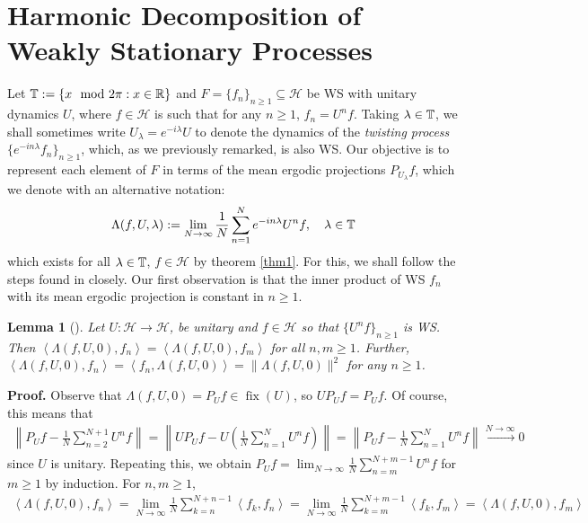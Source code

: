 \documentclass[11pt]{report}
\newcommand{\mc}[1]{\mathcal{#1}}
\newcommand{\ip}[2]{\left\langle#1,#2\right\rangle }
\newcommand{\1}[1]{\mathbbm{1}_{\{#1\}}}
\DeclareMathOperator{\fix}{fix}
\newtheorem{lemma}{Lemma}[section]
\theoremstyle{definition}
\begin{document}
    \section{Harmonic Decomposition of Weakly Stationary Processes}\label{sec4}
    Let $\mathbb{T}:=\{x\mod2\pi:x\in\mathbb{R}\}$ and $F=\{f_n\}_{n\geq
    1}\subseteq\mc{H}$ be WS with unitary dynamics $U$, where $f\in\mc{H}$ is
    such that for any $n\geq 1$, $f_n=U^nf$. Taking $\lambda\in\mathbb{T}$, we
    shall sometimes write $U_\lambda=e^{-i\lambda}U$ to denote the dynamics of
    the \textit{twisting process} $\{e^{-in\lambda}f_n\}_{n\geq 1}$, which, as
    we previously remarked, is also WS. Our objective is to represent each
    element of $F$ in terms of the mean ergodic projections $P_{U_\lambda}f$,
    which we denote with an alternative notation:
    \begin{align}
        \Lambda(f,U,\lambda):=\lim_{N\rightarrow\infty}\frac{1}{N}\sum_{n=1}^N e^{-in\lambda}U^nf,\quad\lambda\in\mathbb{T}
    \end{align}
    which exists for all $\lambda\in\mathbb{T}$, $f\in\mc{H}$ by theorem \ref{thm1}.
    For this, we shall follow the steps found in\cite[\S6]{Fan_1946} closely. Our first observation is
    that the inner product of WS $f_n$ with its mean ergodic projection is constant in $n\geq 1$.
    \begin{lemma}[{\cite[corollary 4]{Fan_1946}}]\label{lem6}
        Let $U:\mc{H}\rightarrow\mc{H}$, be unitary and $f\in\mc{H}$ so that
        $\{U^nf\}_{n\geq 1}$ is WS. Then
        $\ip{\Lambda(f,U,0)}{f_n}=\ip{\Lambda(f,U,0)}{f_m}$ for all $n,m\geq 1$. Further, $\ip{\Lambda(f,U,0)}{f_n}=\ip{f_n}{\Lambda(f,U,0)}=\|\Lambda(f,U,0)\|^2$ for any $n\geq 1$.
    \end{lemma}
    \noindent\textbf{Proof.} Observe that $\Lambda(f,U,0)=P_Uf\in\fix(U)$, so
    $UP_Uf=P_Uf$. Of course, this means that
    \begin{align*}
        \left\|P_Uf-\frac{1}{N}\sum_{n=2}^{N+1}U^nf\right\|=\left\|UP_Uf-U\left(\frac{1}{N}\sum_{n=1}^{N}U^nf\right)\right\|=\left\|P_Uf-\frac{1}{N}\sum_{n=1}^NU^nf\right\|\overset{N\rightarrow\infty}{\longrightarrow} 0
    \end{align*}
    since $U$ is unitary. Repeating this, we obtain
    $P_Uf=\lim_{N\rightarrow\infty}\frac{1}{N}\sum_{n=m}^{N+m-1}U^nf$ for $m\geq1$
    by induction. For $n,m\geq 1$,
    \begin{align*}
        \ip{\Lambda(f,U,0)}{f_n}=\lim_{N\rightarrow\infty}\frac{1}{N}\sum_{k=n}^{N+n-1}\ip{f_k}{f_n}=\lim_{N\rightarrow\infty}\frac{1}{N}\sum_{k=m}^{N+m-1}\ip{f_k}{f_m}=\ip{\Lambda(f,U,0)}{f_m}
    \end{align*}
\end{document}
